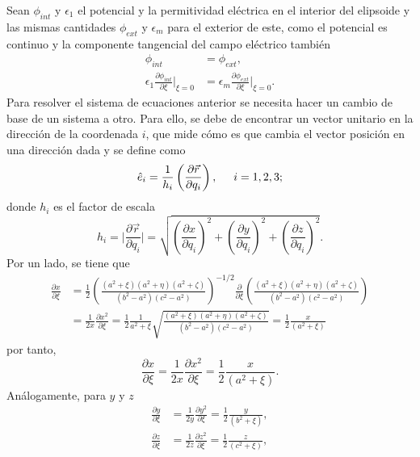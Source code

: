 Sean $\phi_{int}$ y $\epsilon_1$ el potencial y la permitividad eléctrica en el interior del elipsoide y las mismas cantidades $\phi_{ext}$ y $\epsilon_m$ para el exterior de este, como el potencial es continuo y la componente tangencial del campo eléctrico también
\begin{subequations}
\label{condicionesfrontera}
\begin{align}
    \phi_{int}&=\phi_{ext}\label{cf1},\\
    \epsilon_1\frac{\partial \phi_{int}}{\partial \xi}\Big |_{\xi=0}&=
    \epsilon_m\frac{\partial \phi_{ext}}{\partial \xi}\Big |_{\xi=0}\label{cf2}.
\end{align}
\end{subequations}
Para resolver el sistema de ecuaciones anterior se necesita hacer un cambio de base de un sistema a otro. Para ello, se debe de encontrar un vector unitario en la dirección de la coordenada $i$, que mide cómo es que cambia el vector posición en una dirección dada y se define como \cite{Arfken}
\begin{equation}
    \hat{e}_{i}=\frac{1}{h_i}\left(\frac{\partial \Vec{r}}{\partial q_i}\right), \hspace{0.5cm} i=1,2,3;    
\end{equation}
donde $h_i$ es el factor de escala
\begin{equation}
    h_i=\Big|\frac{\partial \Vec{r}}{\partial q_i}\Big|=\sqrt{\left(\frac{\partial x}{\partial q_i}\right)^2+\left(\frac{\partial y}{\partial q_i}\right)^2+\left(\frac{\partial z}{\partial q_i}\right)^2}.
\end{equation}
Por un lado, se tiene que 
\begin{align*}
  \frac{\partial x}{\partial \xi}&=\frac{1}{2}\left(\frac{(a^2+\xi)(a^2+\eta)(a^2+\zeta)}{(b^2-a^2)(c^2-a^2)}\right)^{-1/2}\frac{\partial}{\partial \xi}\left(\frac{(a^2+\xi)(a^2+\eta)(a^2+\zeta)}{(b^2-a^2)(c^2-a^2)}\right)\nonumber\\
  &=\frac{1}{2x}\frac{\partial x^2}{\partial\xi}=\frac{1}{2}\frac{1}{a^2+\xi}\sqrt{\frac{(a^2+\xi)(a^2+\eta)(a^2+\zeta)}{(b^2-a^2)(c^2-a^2)}}=\frac{1}{2}\frac{x}{(a^2+\xi)}
\end{align*}
por tanto,
\begin{equation}
    \frac{\partial x}{\partial \xi}=\frac{1}{2x}\frac{\partial x^2}{\partial\xi}=\frac{1}{2}\frac{x}{(a^2+\xi)}.
\end{equation}
Análogamente, para $y$ y $z$
\begin{align}
    \frac{\partial y}{\partial \xi}&=\frac{1}{2y}\frac{\partial y^2}{\partial\xi}=\frac{1}{2}\frac{y}{(b^2+\xi)},\\
    \frac{\partial z}{\partial \xi}&=\frac{1}{2z}\frac{\partial z^2}{\partial\xi}=\frac{1}{2}\frac{z}{(c^2+\xi)},
\end{align}
